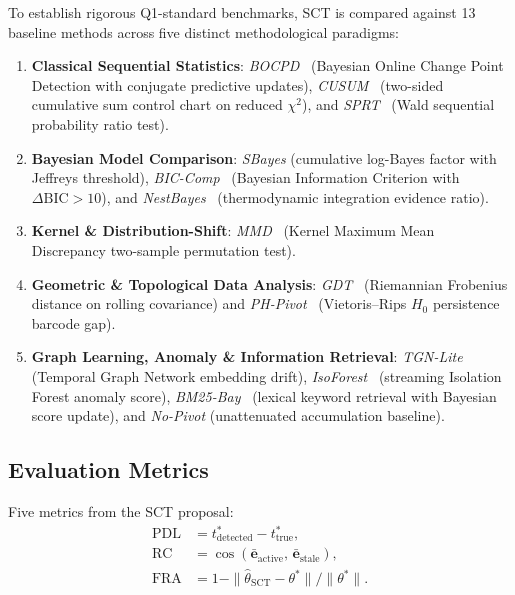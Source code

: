 \documentclass[conference]{IEEEtran}
\newcommand{\ee}{\mathbf{e}}
\begin{document}
To establish rigorous Q1-standard benchmarks, SCT is compared against 13 baseline methods across five distinct methodological paradigms:
\begin{enumerate}
  \item \textbf{Classical Sequential Statistics}: 
    \emph{BOCPD}~\cite{adams2007} (Bayesian Online Change Point Detection with conjugate predictive updates),
    \emph{CUSUM}~\cite{page1954} (two-sided cumulative sum control chart on reduced $\chi^2$), and
    \emph{SPRT}~\cite{wald1945} (Wald sequential probability ratio test).
  \item \textbf{Bayesian Model Comparison}: 
    \emph{SBayes} (cumulative log-Bayes factor with Jeffreys threshold),
    \emph{BIC-Comp}~\cite{schwarz1978,liddle2007} (Bayesian Information Criterion with $\Delta\mathrm{BIC}>10$), and
    \emph{NestBayes}~\cite{skilling2004,feroz2009} (thermodynamic integration evidence ratio).
  \item \textbf{Kernel \& Distribution-Shift}: 
    \emph{MMD}~\cite{gretton2012} (Kernel Maximum Mean Discrepancy two-sample permutation test).
  \item \textbf{Geometric \& Topological Data Analysis}: 
    \emph{GDT}~\cite{pennec2006,dryden2009} (Riemannian Frobenius distance on rolling covariance) and
    \emph{PH-Pivot}~\cite{edelsbrunner2010,carlsson2009} (Vietoris--Rips $H_0$ persistence barcode gap).
  \item \textbf{Graph Learning, Anomaly \& Information Retrieval}: 
    \emph{TGN-Lite}~\cite{rossi2020,xu2020} (Temporal Graph Network embedding drift),
    \emph{IsoForest}~\cite{liu2008} (streaming Isolation Forest anomaly score),
    \emph{BM25-Bay}~\cite{robertson1995} (lexical keyword retrieval with Bayesian score update), and
    \emph{No-Pivot} (unattenuated accumulation baseline).
\end{enumerate}

\subsection{Evaluation Metrics}

Five metrics from the SCT proposal:
\begin{align}
  \mathrm{PDL} &= t^*_\mathrm{detected} - t^*_\mathrm{true},
    \label{eq:pdl}\\
  \mathrm{RC}  &= \cos(\bar{\ee}_\mathrm{active},\,\bar{\ee}_\mathrm{stale}),
    \label{eq:rc}\\
  \mathrm{FRA} &= 1 - \|\hat{\theta}_\mathrm{SCT} - \theta^*\|/\|\theta^*\|.
    \label{eq:fra}
\end{align}
\end{document}
